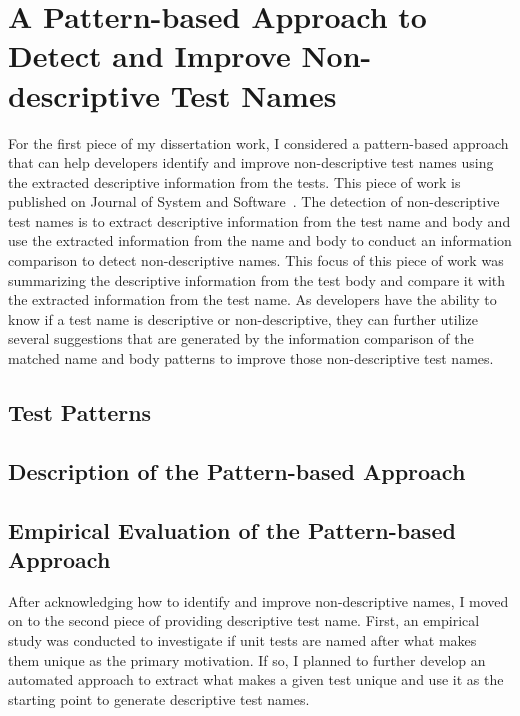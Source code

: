 \section{A Pattern-based Approach to Detect and Improve Non-descriptive Test Names}
\label{sec:test-pattern-section}

For the first piece of my dissertation work, I considered a pattern-based approach that can help developers identify and improve non-descriptive test names using the extracted descriptive information from the tests.
%
This piece of work is published on Journal of System and Software~\cite{wu2020pattern}.
%
The detection of non-descriptive test names is to extract descriptive information from the test name and body and use the extracted information  from the name and body to conduct an information comparison to detect non-descriptive names.
%
This focus of this piece of work was summarizing the descriptive information from the test body and compare it with the extracted information from the test name.
%
As developers have the ability to know if a test name is descriptive or non-descriptive, they can further utilize several suggestions that are generated by the information comparison of the matched name and body patterns to improve those non-descriptive test names.


\subsection{Test Patterns}
\label{sec:test_patterns}

\subsection{Description of the Pattern-based Approach}
\label{sec:approach-pattern}

\subsection{Empirical Evaluation of the Pattern-based Approach}
\label{sec:evaluation-pattern}


After acknowledging how to identify and improve non-descriptive names, I moved on to the second piece of providing descriptive test name.
%
First, an empirical study was conducted to investigate if unit tests are named after what makes them unique as the primary motivation.
%
If so, I planned to further develop an automated approach to extract what makes a given test unique and use it as the starting point to generate descriptive test names.
